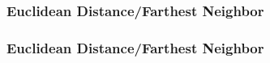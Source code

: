 \documentclass[10pt]{beamer}
\begin{document}
\begin{frame}[fragile]
\frametitle{Euclidean Distance/Farthest Neighbor}
\label{iriscluster1}
\begin{center}
\end{center}
\end{frame}

\begin{frame}[fragile]
\frametitle{Euclidean Distance/Farthest Neighbor}
\begin{center}
\end{center}
\end{frame}
\end{document}
